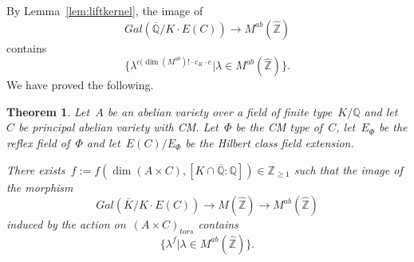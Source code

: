 \documentclass[12pt]{amsart}
\newtheorem{theorem}{Theorem}[section]
\newcommand{\Hom}{\mbox{Hom}}
\newcommand{\Z}{{\mathbb Z}}
\newcommand{\Q}{{\mathbb Q}}
\newcommand{\C}{{\mathbb C}}
\newcommand{\ol}{\overline}
\newcommand{\wh}{\widehat}
\begin{document}
By Lemma~\ref{lem:liftkernel}, the image of
\[
Gal(\ol{\Q}/K\cdot E(C))\to M^{ab}(\wh{\Z})
\]
contains
\[
\{\lambda^{c(\dim(M^{ab})!\cdot c_K\cdot e}|\lambda \in M^{ab}(\wh{\Z})\}.
\]
We have proved the following.
\begin{theorem}\label{thm:Reciprocity principal}
Let~$A$ be an abelian variety over a field of finite type~$K/\Q$ and let~$C$ be principal abelian variety with CM. Let~$\Phi$ be the CM type of~$C$, let~$E_\Phi$ be the reflex field of~$\Phi$ and let~$E(C)/E_\Phi$ be the Hilbert class field extension.
  
There exists~$f:=f(\dim(A\times C),[K\cap \ol{\Q}:\Q])\in\Z_{\geq1}$ such that the image of the morphism
\[
Gal(\ol{K}/K\cdot E(C))\to M(\wh{\Z}) \to M^{ab}(\wh{\Z})
\]
induced by the action on~$(A\times C)_{tors}$ contains
\[
\{\lambda^{f}|\lambda \in M^{ab}(\wh{\Z})\}.
\]
\end{theorem}
%
\end{document}
